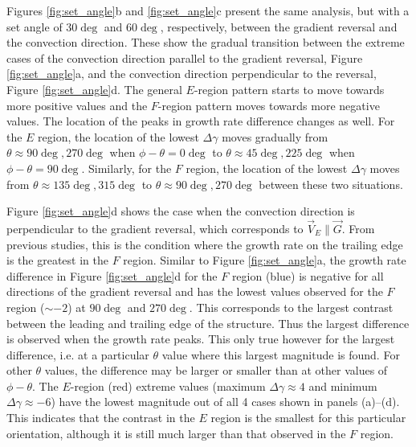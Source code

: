 Figures \ref{fig:set_angle}b and \ref{fig:set_angle}c present the same analysis, but with a set angle of \(30\deg\) and \(60\deg\), respectively, between the gradient reversal and the convection direction.  These show the gradual transition between the extreme cases of the convection direction parallel to the gradient reversal, Figure \ref{fig:set_angle}a, and the convection direction perpendicular to the reversal, Figure \ref{fig:set_angle}d.  The general \(E\)-region pattern starts to move towards more positive values and the \(F\)-region pattern moves towards more negative values.  The location of the peaks in growth rate difference changes as well. For the \(E\) region, the location of the lowest \(\Delta\gamma\) moves gradually from \(\theta\approx 90\deg, 270\deg\) when \(\phi-\theta=0\deg\) to \(\theta\approx 45\deg, 225\deg\) when \(\phi-\theta=90\deg\). Similarly, for the \(F\) region, the location of the lowest \(\Delta\gamma\) moves from \(\theta\approx 135\deg, 315\deg\) to \(\theta\approx 90\deg, 270\deg\) between these two situations.

Figure \ref{fig:set_angle}d shows the case when the convection direction is perpendicular to the gradient reversal, which corresponds to \(\vec{V}_E \parallel \vec{G}\).  From previous studies, this is the condition where the growth rate on the trailing edge is the greatest in the \(F\) region.  Similar to Figure \ref{fig:set_angle}a, the growth rate difference in Figure \ref{fig:set_angle}d for the \(F\) region (blue) is negative for all directions of the gradient reversal and has the lowest values observed for the \(F\) region (\(\sim-2\)) at \(90\deg\) and \(270\deg\). This corresponds to the largest contrast between the leading and trailing edge of the structure. Thus the largest difference is observed when the growth rate peaks. This only true however for the largest difference, i.e. at a particular $\theta$ value where this largest magnitude is found. For other \(\theta\) values, the difference may be larger or smaller than at other values of \(\phi-\theta\). The \(E\)-region (red) extreme values (maximum \(\Delta\gamma\approx 4\) and minimum \(\Delta\gamma\approx -6\)) have the lowest magnitude out of all 4 cases shown in panels (a)--(d).  This indicates that the contrast in the \(E\) region is the smallest for this particular orientation, although it is still much larger than that observed in the \(F\) region.

